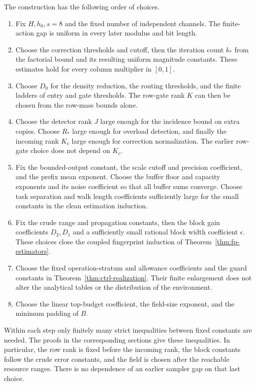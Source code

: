 The construction has the following order of choices.
\begin{enumerate}
\item Fix $H,h_0,s=8$ and the fixed number of independent channels.
The finite-action gap is uniform in every later modulus and bit length.
\item Choose the correction thresholds and cutoff, then the iteration
count $k_*$ from the factorial bound and its resulting uniform
magnitude constants. These estimates hold for every column multiplier
in $[0,1]$.
\item Choose $D_0$ for the density reduction, the routing thresholds,
and the finite ladders of entry and gate thresholds. The row-gate
rank $K$ can then be chosen from the row-mass bounds alone.
\item Choose the detector rank $J$ large enough for the incidence
bound on extra copies. Choose $R_*$ large enough for overload
detection, and finally the incoming rank $K_c$ large enough for
correction normalization. The earlier row-gate choice does not depend
on $K_c$.
\item Fix the bounded-output constant, the scale cutoff and precision
coefficient, and the prefix mean exponent. Choose the buffer
floor and capacity exponents and its noise coefficient so that all
buffer sums converge. Choose task separation and walk length
coefficients sufficiently large for the small constants in the
clean estimation induction.
\item Fix the crude range and propagation constants, then the block
gain coefficients $D_2,D_1$ and a sufficiently small rational block
width coefficient $\epsilon$. These choices close the coupled
fingerprint induction of Theorem~\ref{thm:fp-estimators}.
\item Choose the fixed operation-stratum and allowance coefficients
and the guard constants in Theorem~\ref{thm:ctrl-realization}.
Their finite enlargement does not alter the analytical tables or
the distribution of the environment.
\item Choose the linear top-budget coefficient, the field-size
exponent, and the minimum padding of $B$.
\end{enumerate}
Within each step only finitely many strict inequalities between
fixed constants are needed. The proofs in the corresponding sections
give these inequalities. In particular, the row rank is fixed before
the incoming rank, the block constants follow the crude error
constants, and the field is chosen after the reachable resource
ranges. There is no dependence of an earlier sampler gap on that
last choice.

